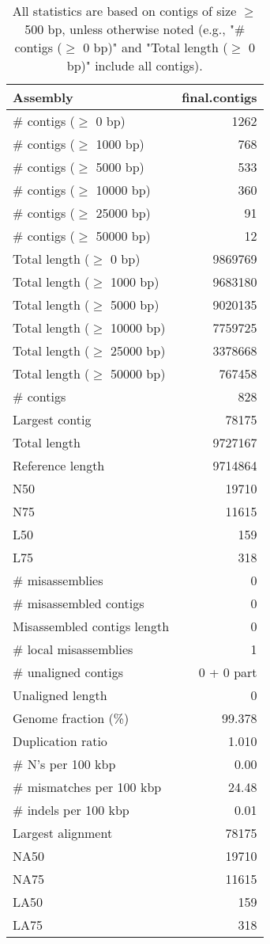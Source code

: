\documentclass[12pt,a4paper]{article}
\begin{document}
\begin{table}[ht]
\begin{center}
\caption{All statistics are based on contigs of size $\geq$ 500 bp, unless otherwise noted (e.g., "\# contigs ($\geq$ 0 bp)" and "Total length ($\geq$ 0 bp)" include all contigs).}
\begin{tabular}{|l*{1}{|r}|}
\hline
Assembly & final.contigs \\ \hline
\# contigs ($\geq$ 0 bp) & 1262 \\ \hline
\# contigs ($\geq$ 1000 bp) & 768 \\ \hline
\# contigs ($\geq$ 5000 bp) & 533 \\ \hline
\# contigs ($\geq$ 10000 bp) & 360 \\ \hline
\# contigs ($\geq$ 25000 bp) & 91 \\ \hline
\# contigs ($\geq$ 50000 bp) & 12 \\ \hline
Total length ($\geq$ 0 bp) & 9869769 \\ \hline
Total length ($\geq$ 1000 bp) & 9683180 \\ \hline
Total length ($\geq$ 5000 bp) & 9020135 \\ \hline
Total length ($\geq$ 10000 bp) & 7759725 \\ \hline
Total length ($\geq$ 25000 bp) & 3378668 \\ \hline
Total length ($\geq$ 50000 bp) & 767458 \\ \hline
\# contigs & 828 \\ \hline
Largest contig & 78175 \\ \hline
Total length & 9727167 \\ \hline
Reference length & 9714864 \\ \hline
N50 & 19710 \\ \hline
N75 & 11615 \\ \hline
L50 & 159 \\ \hline
L75 & 318 \\ \hline
\# misassemblies & 0 \\ \hline
\# misassembled contigs & 0 \\ \hline
Misassembled contigs length & 0 \\ \hline
\# local misassemblies & 1 \\ \hline
\# unaligned contigs & 0 + 0 part \\ \hline
Unaligned length & 0 \\ \hline
Genome fraction (\%) & 99.378 \\ \hline
Duplication ratio & 1.010 \\ \hline
\# N's per 100 kbp & 0.00 \\ \hline
\# mismatches per 100 kbp & 24.48 \\ \hline
\# indels per 100 kbp & 0.01 \\ \hline
Largest alignment & 78175 \\ \hline
NA50 & 19710 \\ \hline
NA75 & 11615 \\ \hline
LA50 & 159 \\ \hline
LA75 & 318 \\ \hline
\end{tabular}
\end{center}
\end{table}
\end{document}
